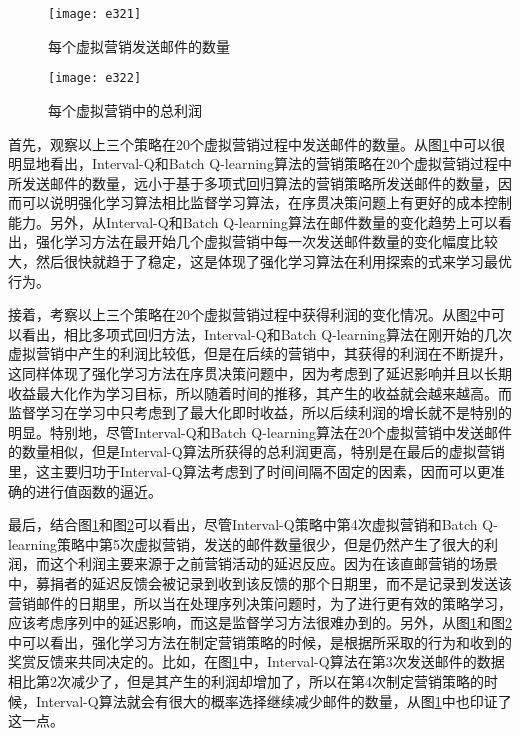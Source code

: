 \begin{figure}[htbp]
\centering
\texttt{[image: e321]}
\caption{每个虚拟营销发送邮件的数量}
\label{fig:e321}
\end{figure}

\begin{figure}[htbp]
\centering
\texttt{[image: e322]}
\caption{每个虚拟营销中的总利润}
\label{fig:e322}
\end{figure}

首先，观察以上三个策略在20个虚拟营销过程中发送邮件的数量。从图\ref{fig:e321}中可以很明显地看出，Interval-Q和Batch Q-learning算法的营销策略在20个虚拟营销过程中所发送邮件的数量，远小于基于多项式回归算法的营销策略所发送邮件的数量，因而可以说明强化学习算法相比监督学习算法，在序贯决策问题上有更好的成本控制能力。另外，从Interval-Q和Batch Q-learning算法在邮件数量的变化趋势上可以看出，强化学习方法在最开始几个虚拟营销中每一次发送邮件数量的变化幅度比较大，然后很快就趋于了稳定，这是体现了强化学习算法在利用探索的式来学习最优行为。



接着，考察以上三个策略在20个虚拟营销过程中获得利润的变化情况。从图\ref{fig:e322}中可以看出，相比多项式回归方法，Interval-Q和Batch Q-learning算法在刚开始的几次虚拟营销中产生的利润比较低，但是在后续的营销中，其获得的利润在不断提升，这同样体现了强化学习方法在序贯决策问题中，因为考虑到了延迟影响并且以长期收益最大化作为学习目标，所以随着时间的推移，其产生的收益就会越来越高。而监督学习在学习中只考虑到了最大化即时收益，所以后续利润的增长就不是特别的明显。特别地，尽管Interval-Q和Batch Q-learning算法在20个虚拟营销中发送邮件的数量相似，但是Interval-Q算法所获得的总利润更高，特别是在最后的虚拟营销里，这主要归功于Interval-Q算法考虑到了时间间隔不固定的因素，因而可以更准确的进行值函数的逼近。

最后，结合图\ref{fig:e321}和图\ref{fig:e322}可以看出，尽管Interval-Q策略中第4次虚拟营销和Batch Q-learning策略中第5次虚拟营销，发送的邮件数量很少，但是仍然产生了很大的利润，而这个利润主要来源于之前营销活动的延迟反应。因为在该直邮营销的场景中，募捐者的延迟反馈会被记录到收到该反馈的那个日期里，而不是记录到发送该营销邮件的日期里，所以当在处理序列决策问题时，为了进行更有效的策略学习，应该考虑序列中的延迟影响，而这是监督学习方法很难办到的。另外，从图\ref{fig:e321}和图\ref{fig:e322}中可以看出，强化学习方法在制定营销策略的时候，是根据所采取的行为和收到的奖赏反馈来共同决定的。比如，在图\ref{fig:e321}中，Interval-Q算法在第3次发送邮件的数据相比第2次减少了，但是其产生的利润却增加了，所以在第4次制定营销策略的时候，Interval-Q算法就会有很大的概率选择继续减少邮件的数量，从图\ref{fig:e321}中也印证了这一点。

